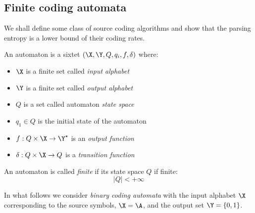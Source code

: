 \documentclass[toc]{../cs-classes/cs-classes}
\begin{document}
\subsection{Finite coding automata}
We shall define some class of source coding algorithms and show that the parsing entropy is a lower bound of their coding rates.

\begin{definition}[Automaton]
    An automaton is a sixtet $(\X, \Y, Q, q_i, f, \delta)$ where:
    \begin{itemize}
        \item $\X$ is a finite set called \emph{input alphabet}
        \item $\Y$ is a finite set called \emph{output alphabet}
        \item $Q$ is a set called automaton \emph{state space}
        \item $q_1\in Q$ is the initial state of the automaton
        \item $f:Q\times\X\rightarrow\Y^\star$ is an \emph{output function}
        \item $\delta:Q\times\X\rightarrow Q$ is a \emph{transition function}
    \end{itemize}
\end{definition}

\begin{definition}
    An automaton is called \emph{finite} if its state space $Q$ if finite:
    \begin{equation*}
        |Q|<+\infty
    \end{equation*}
\end{definition}

In what follows we consider \emph{binary coding automata} with the input alphabet $\X$ corresponding to the source symbols, $\X=\A$, and the output set $\Y=\{0, 1\}$.
\end{document}
